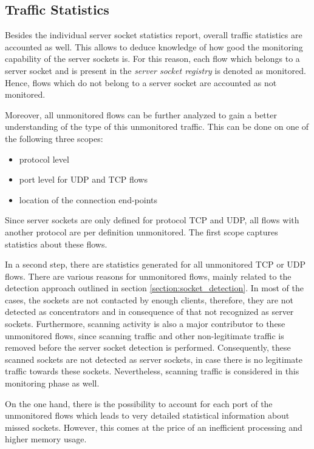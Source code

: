 \subsection{Traffic Statistics}

Besides the individual \gls{server socket} statistics report, overall traffic statistics are accounted as well. This allows to deduce knowledge of how good the monitoring capability of the \glspl{server socket} is. For this reason, each flow which belongs to a \gls{server socket} and is present in the \emph{server socket registry} is denoted as monitored. Hence, flows which do not belong to a \gls{server socket} are accounted as not monitored.

Moreover, all unmonitored flows can be further analyzed to gain a better understanding of the type of this unmonitored traffic. This can be done on one of the following three scopes:
\begin{itemize}
	\item protocol level
	\item port level for \gls{UDP} and \gls{TCP} flows
	\item location of the connection end-points
\end{itemize}

Since \glspl{server socket} are only defined for protocol \gls{TCP} and \gls{UDP}, all flows with another protocol are per definition unmonitored. The first scope captures statistics about these flows.

In a second step, there are statistics generated for all unmonitored \gls{TCP} or \gls{UDP} flows. There are various reasons for unmonitored flows, mainly related to the detection approach outlined in section \ref{section:socket_detection}. 
In most of the cases, the sockets are not contacted by enough clients, therefore, they are not detected as concentrators and in consequence of that not recognized as \glspl{server socket}. 
Furthermore, scanning activity is also a major contributor to these unmonitored flows, since scanning traffic and other non-legitimate traffic is removed before the \gls{server socket} detection is performed. Consequently, these scanned sockets are not detected as \glspl{server socket}, in case there is no legitimate traffic towards these sockets. Nevertheless, scanning traffic is considered in this monitoring phase as well.

On the one hand, there is the possibility to account for each port of the unmonitored flows which leads to very detailed statistical information about missed sockets. However, this comes at the price of an inefficient processing and higher memory usage.

